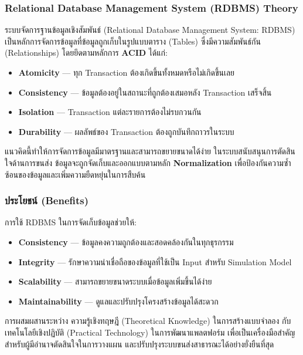 \subsubsection{Relational Database Management System (RDBMS) Theory}
\begin{mypara}
    \indent ระบบจัดการฐานข้อมูลเชิงสัมพันธ์ (Relational Database Management System: RDBMS) 
    เป็นหลักการจัดการข้อมูลที่ข้อมูลถูกเก็บในรูปแบบตาราง (Tables) 
    ซึ่งมีความสัมพันธ์กัน (Relationships) โดยยึดตามหลักการ \textbf{ACID} ได้แก่:
\end{mypara}
\begin{itemize}
    \item \textbf{Atomicity} — ทุก Transaction ต้องเกิดขึ้นทั้งหมดหรือไม่เกิดขึ้นเลย
    \item \textbf{Consistency} — ข้อมูลต้องอยู่ในสถานะที่ถูกต้องเสมอหลัง Transaction เสร็จสิ้น
    \item \textbf{Isolation} — Transaction แต่ละรายการต้องไม่รบกวนกัน
    \item \textbf{Durability} — ผลลัพธ์ของ Transaction ต้องถูกบันทึกถาวรในระบบ
\end{itemize}

แนวคิดนี้ทำให้การจัดการข้อมูลมีมาตรฐานและสามารถขยายขนาดได้ง่าย
ในระบบสนับสนุนการตัดสินใจด้านการขนส่ง
ข้อมูลจะถูกจัดเก็บและออกแบบตามหลัก \textbf{Normalization} 
เพื่อป้องกันความซ้ำซ้อนของข้อมูลและเพิ่มความยืดหยุ่นในการสืบค้น

\subsubsection{\textbf{ประโยชน์ (Benefits)}}
\begin{mypara}
    \indent การใช้ RDBMS ในการจัดเก็บข้อมูลช่วยให้:
\end{mypara}
\begin{itemize}
    \item \textbf{Consistency} — ข้อมูลคงความถูกต้องและสอดคล้องกันในทุกธุรกรรม
    \item \textbf{Integrity} — รักษาความน่าเชื่อถือของข้อมูลที่ใช้เป็น Input สำหรับ Simulation Model
    \item \textbf{Scalability} — สามารถขยายขนาดระบบเมื่อข้อมูลเพิ่มขึ้นได้ง่าย
    \item \textbf{Maintainability} — ดูแลและปรับปรุงโครงสร้างข้อมูลได้สะดวก
\end{itemize}

\begin{mypara}
    \indent การผสมผสานระหว่าง ความรู้เชิงทฤษฎี (Theoretical Knowledge) 
ในการสร้างแบบจำลอง กับ เทคโนโลยีเชิงปฏิบัติ (Practical Technology) 
ในการพัฒนาแพลตฟอร์ม เพื่อเป็นเครื่องมือสำคัญสำหรับผู้มีอำนาจตัดสินใจในการวางแผน
และปรับปรุงระบบขนส่งสาธารณะได้อย่างยั่งยืนที่สุด
\end{mypara}

